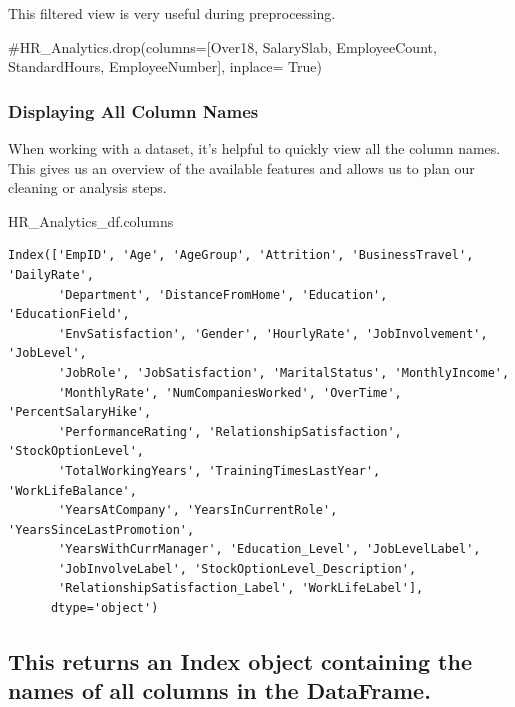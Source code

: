 \documentclass[
  letterpaper,
  DIV=11,
  numbers=noendperiod]{scrartcl}
\newenvironment{Shaded}{\begin{snugshade}}{\end{snugshade}}
\newcommand{\CommentTok}[1]{\textcolor[rgb]{0.37,0.37,0.37}{#1}}
\newcommand{\NormalTok}[1]{\textcolor[rgb]{0.00,0.23,0.31}{#1}}
\begin{document}
This filtered view is very useful during preprocessing.

\begin{Shaded}
\begin{Highlighting}[]
\CommentTok{\#HR\_Analytics.drop(columns=[\textquotesingle{}Over18\textquotesingle{}, \textquotesingle{}SalarySlab\textquotesingle{}, \textquotesingle{}EmployeeCount\textquotesingle{}, \textquotesingle{}StandardHours\textquotesingle{}, \textquotesingle{}EmployeeNumber\textquotesingle{}], inplace= True)}
\end{Highlighting}
\end{Shaded}

\subsubsection{Displaying All Column
Names}\label{displaying-all-column-names}

When working with a dataset, it's helpful to quickly view all the column
names. This gives us an overview of the available features and allows us
to plan our cleaning or analysis steps.

\begin{Shaded}
\begin{Highlighting}[]
\NormalTok{HR\_Analytics\_df.columns}
\end{Highlighting}
\end{Shaded}

\begin{verbatim}
Index(['EmpID', 'Age', 'AgeGroup', 'Attrition', 'BusinessTravel', 'DailyRate',
       'Department', 'DistanceFromHome', 'Education', 'EducationField',
       'EnvSatisfaction', 'Gender', 'HourlyRate', 'JobInvolvement', 'JobLevel',
       'JobRole', 'JobSatisfaction', 'MaritalStatus', 'MonthlyIncome',
       'MonthlyRate', 'NumCompaniesWorked', 'OverTime', 'PercentSalaryHike',
       'PerformanceRating', 'RelationshipSatisfaction', 'StockOptionLevel',
       'TotalWorkingYears', 'TrainingTimesLastYear', 'WorkLifeBalance',
       'YearsAtCompany', 'YearsInCurrentRole', 'YearsSinceLastPromotion',
       'YearsWithCurrManager', 'Education_Level', 'JobLevelLabel',
       'JobInvolveLabel', 'StockOptionLevel_Description',
       'RelationshipSatisfaction_Label', 'WorkLifeLabel'],
      dtype='object')
\end{verbatim}

\subsection{This returns an Index object containing the names of all
columns in the
DataFrame.}\label{this-returns-an-index-object-containing-the-names-of-all-columns-in-the-dataframe.}
\end{document}
